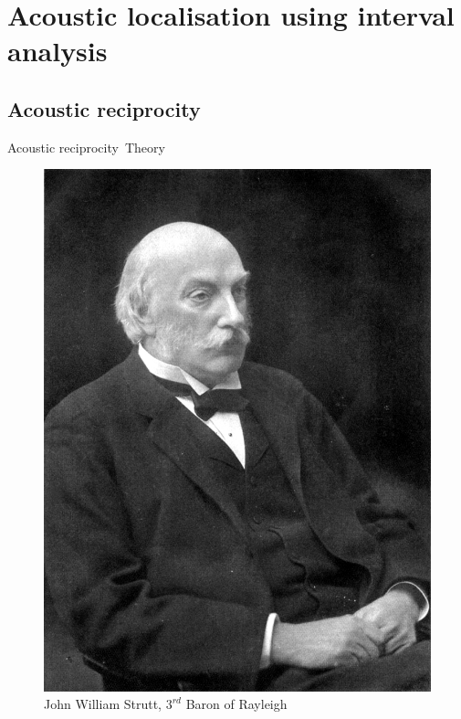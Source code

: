 \documentclass[9pt, xcolor={usenames, dvipsnames}]{beamer}
\begin{document}
		\section{Acoustic localisation using interval analysis}

			\subsection{Acoustic reciprocity}

				\begin{frame}{Acoustic reciprocity~}{Theory}
					\centering
					\begin{minipage}[c]{0.3\textwidth}
						\begin{figure}
							\includegraphics[width=\textwidth]{images/profile/John_William_Strutt.jpg}
							\caption{John William Strutt, $3^{rd}$ Baron of Rayleigh}
						\end{figure}
					\end{minipage}

\end{frame}
\end{document}
